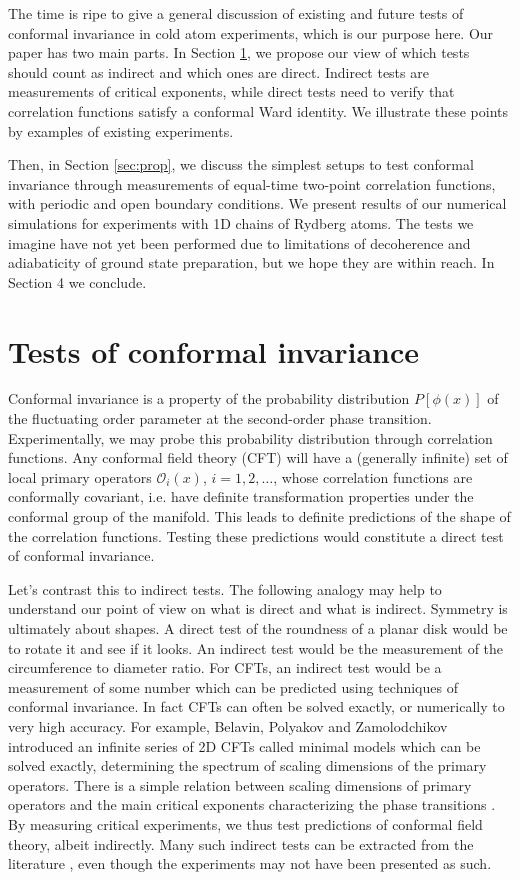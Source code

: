 \documentclass[a4paper,11pt]{article}
\theoremstyle{remark}
\theoremstyle{theorem}
\begin{document}
The time is ripe to give a general discussion of existing and future tests of conformal invariance in cold atom experiments, which is our purpose here. Our paper has two main parts. In Section \ref{sec:gen}, we propose our view of which tests should count as indirect and which ones are direct. Indirect tests are measurements of critical exponents, while direct tests need to verify that correlation functions satisfy a conformal Ward identity. We illustrate these points by examples of existing experiments. 

Then, in Section \ref{sec:prop},  we discuss the simplest setups to test conformal invariance through measurements of equal-time two-point correlation functions, with periodic and open boundary conditions. We present results of our numerical simulations for experiments with 1D chains of Rydberg atoms. The tests we imagine have not yet been performed due to limitations of decoherence and adiabaticity of ground state preparation, but we hope they are within reach. In Section 4 we conclude.

\section{Tests of conformal invariance}
\label{sec:gen}

Conformal invariance is a property of the probability distribution $P[\phi(x)]$ of the fluctuating order parameter at the second-order phase transition. Experimentally, we may probe this probability distribution through correlation functions. Any conformal field theory (CFT) will have a (generally infinite) set of local primary operators $\mathcal{O}_i(x)$, $i=1,2,\ldots$, whose correlation functions are conformally covariant, i.e. have definite transformation properties under the conformal group of the manifold. This leads to definite predictions of the shape of the correlation functions. Testing these predictions would constitute a direct test of conformal invariance.

Let's contrast this to indirect tests. The following analogy may help to understand our point of view on what is direct and what is indirect. Symmetry is ultimately about shapes. A direct test of the roundness of a planar disk would be to rotate it and see if it looks. An indirect test would be the measurement of the circumference to diameter ratio. For CFTs, an indirect test would be a measurement of some number which can be predicted using techniques of conformal invariance. In fact CFTs can often be solved exactly, or numerically to very high accuracy. For example, Belavin, Polyakov and Zamolodchikov \cite{} introduced an infinite series of 2D CFTs called minimal models which can be solved exactly, determining the spectrum of scaling dimensions of the primary operators. There is a simple relation between scaling dimensions of primary operators and the main critical exponents characterizing the phase transitions \cite{}. By measuring critical experiments, we thus test predictions of conformal field theory, albeit indirectly. Many such indirect tests can be extracted from the literature \cite{}, even though the experiments may not have been presented as such.
\end{document}
